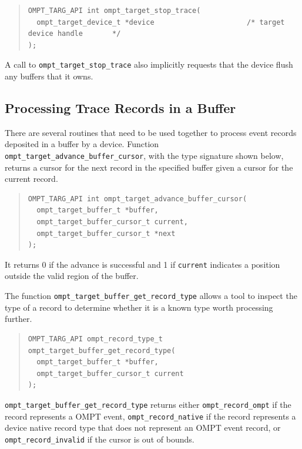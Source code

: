 \documentclass{article}
\begin{document}
\begin{quote}
\begin{verbatim}
OMPT_TARG_API int ompt_target_stop_trace(
  ompt_target_device_t *device                      /* target device handle       */
);
\end{verbatim}
\end{quote}
\noindent
A call to \verb|ompt_target_stop_trace| also implicitly requests that the device flush any buffers that it owns.


\subsection{Processing Trace Records in a Buffer}
\label{sec:record-data}

There are several routines that need to be used together to process %
event records deposited in a buffer by a device. Function \verb|ompt_target_advance_buffer_cursor|, with the type signature shown below, returns a cursor for the next record in the specified buffer given a cursor for the current record.

\begin{quote}
\begin{verbatim}
OMPT_TARG_API int ompt_target_advance_buffer_cursor(
  ompt_target_buffer_t *buffer, 
  ompt_target_buffer_cursor_t current, 
  ompt_target_buffer_cursor_t *next
); 
\end{verbatim}
\end{quote}
It returns 0 if the advance is successful and 1 if \verb|current| indicates a position outside the valid region of the buffer.

The function \verb|ompt_target_buffer_get_record_type| allows a tool to inspect the type of a record to determine whether it is a known type  worth processing further. 
\begin{quote}
\begin{verbatim}
OMPT_TARG_API ompt_record_type_t ompt_target_buffer_get_record_type(
  ompt_target_buffer_t *buffer, 
  ompt_target_buffer_cursor_t current
);
\end{verbatim}
\end{quote}
\sloppy
\verb|ompt_target_buffer_get_record_type| returns either \verb|ompt_record_ompt| if the record represents a OMPT event,  
\verb|ompt_record_native| if the record represents a device native record type that does not represent an OMPT event record, or \verb|ompt_record_invalid| if the cursor is out of bounds. 
\end{document}
